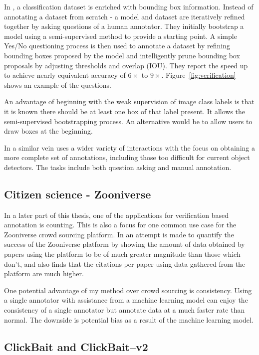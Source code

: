 In \cite{Papadopoulos2016}, a classification dataset is enriched with bounding box information. Instead of annotating a dataset from scratch - a model and dataset are iteratively refined together by asking questions of a human annotator. They initially bootstrap a model using a semi-supervised method  \cite{Cinbis2017} to provide a starting point. A simple Yes/No questioning process is then used to annotate a dataset by refining bounding boxes proposed by the model and intelligently prune bounding box proposals by adjusting thresholds and overlap (\gls{IOU}). They report the speed up to achieve nearly equivalent accuracy of $6\times$ to $9\times$.  Figure~\ref{fig:verification} shows an example of the questions.

An advantage of beginning with the weak supervision of image class labels is that it is known there should be at least one box of that label present. It allows the semi-supervised bootstrapping process. An alternative would be to allow users to draw boxes at the beginning. 

In a similar vein \cite{Russakovsky2015a} uses a wider variety of interactions with the focus on obtaining a more complete set of annotations, including those too difficult for current object detectors. The tasks include both question asking and manual annotation.


\subsection{Citizen science - Zooniverse \cite{Zooniverse}}

In a later part of this thesis, one of the applications for verification based annotation is counting. This is also a focus for one common use case for the Zooniverse crowd sourcing platform. In \cite{Watson2018} an attempt is made to quantify the success of the Zooniverse platform by showing the amount of data obtained by papers using the platform to be of much greater magnitude than those which don't, and also finds that the citations per paper using data gathered from the platform are much higher. 

One potential advantage of my method over crowd sourcing is consistency. Using a single annotator with assistance from a machine learning model can enjoy the consistency of a single annotator but annotate data at a much faster rate than normal. The downside is potential bias as a result of the machine learning model.

\subsection{ClickBait and ClickBait--v2 \cite{Teng2017, Teng2018}}

